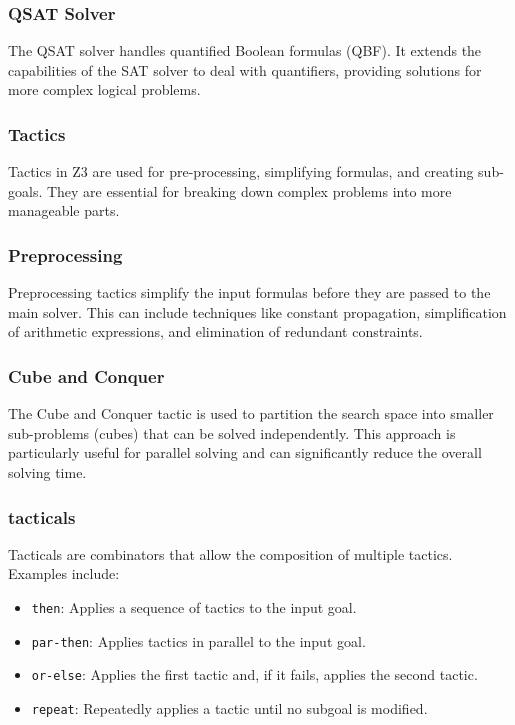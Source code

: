\documentclass[]{rptuseminar}
\begin{document}
\subsubsection*{QSAT Solver}
The QSAT solver handles quantified Boolean formulas (QBF). It extends the capabilities of the SAT solver to deal with quantifiers, 
providing solutions for more complex logical problems.


\subsubsection{Tactics}
Tactics in Z3 are used for pre-processing, simplifying formulas, and creating sub-goals. 
They are essential for breaking down complex problems into more manageable parts.

\subsubsection*{Preprocessing}
Preprocessing tactics simplify the input formulas before they are passed to the main solver. This can include techniques 
like constant propagation, simplification of arithmetic expressions, and elimination of redundant constraints.

\subsubsection*{Cube and Conquer}
The Cube and Conquer tactic is used to partition the search space into smaller sub-problems (cubes) that can be solved independently. 
This approach is particularly useful for parallel solving and can significantly reduce the overall solving time.

\subsubsection*{tacticals}
Tacticals are combinators that allow the composition of multiple tactics. Examples include:

\begin{itemize}
    \item \texttt{then}: Applies a sequence of tactics to the input goal.
    \item \texttt{par-then}: Applies tactics in parallel to the input goal.
    \item \texttt{or-else}: Applies the first tactic and, if it fails, applies the second tactic.
    \item \texttt{repeat}: Repeatedly applies a tactic until no subgoal is modified.
\end{itemize}
\end{document}
